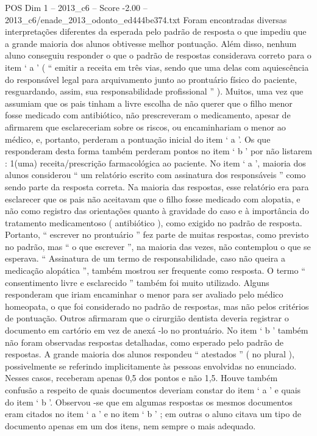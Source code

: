 \begin{textsample}{POS Dim 1 – 2013\_c6 – Score -2.00 – 2013\_c6/enade\_2013\_odonto\_ed444be374.txt}
Foram encontradas diversas interpretações diferentes da esperada pelo padrão de resposta o que impediu que a grande maioria dos alunos obtivesse melhor pontuação.
Além disso, nenhum aluno conseguiu responder o que o padrão de respostas considerava correto para o item ‘ a ’ ( “ emitir a receita em três vias, sendo que uma delas com aquiescência do responsável legal para arquivamento junto ao prontuário físico do paciente, resguardando, assim, sua responsabilidade profissional ” ).
Muitos, uma vez que assumiam que os pais tinham a livre escolha de não querer que o filho menor fosse medicado com antibiótico, não prescreveram o medicamento, apesar de afirmarem que esclareceriam sobre os riscos, ou encaminhariam o menor ao médico, e, portanto, perderam a pontuação inicial do item ‘ a ’.
Os que responderam desta forma também perderam pontos no item ‘ b ’ por não listarem : 1(uma) receita/prescrição farmacológica ao paciente.
No item ‘ a ’, maioria dos alunos considerou “ um relatório escrito com assinatura dos responsáveis ” como sendo parte da resposta correta.
Na maioria das respostas, esse relatório era para esclarecer que os pais não aceitavam que o filho fosse medicado com alopatia, e não como registro das orientações quanto à gravidade do caso e à importância do tratamento medicamentoso ( antibiótico ), como exigido no padrão de resposta.
Portanto, “ escrever no prontuário ” fez parte de muitas respostas, como previsto no padrão, mas “ o que escrever ”, na maioria das vezes, não contemplou o que se esperava. “ Assinatura de um termo de responsabilidade, caso não queira a medicação alopática ”, também mostrou ser frequente como resposta.
O termo “ consentimento livre e esclarecido ” também foi muito utilizado.
Alguns responderam que iriam encaminhar o menor para ser avaliado pelo médico homeopata, o que foi considerado no padrão de respostas, mas não pelos critérios de pontuação.
Outros afirmaram que o cirurgião dentista deveria registrar o documento em cartório em vez de anexá -lo no prontuário.
No item ‘ b ’ também não foram observadas respostas detalhadas, como esperado pelo padrão de respostas.
A grande maioria dos alunos respondeu “ atestados ” ( no plural ), possivelmente se referindo implicitamente às pessoas envolvidas no enunciado.
Nesses casos, receberam apenas 0,5 dos pontos e não 1,5.
Houve também confusão a respeito de quais documentos deveriam constar do item ‘ a ’ e quais do item ‘ b ’.
Observou -se que em algumas respostas os mesmos documentos eram citados no item ‘ a ’ e no item ‘ b ’ ; em outras o aluno citava um tipo de documento apenas em um dos itens, nem sempre o mais adequado.

\end{textsample}
